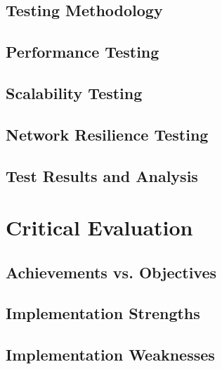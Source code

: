 \documentclass[12pt,a4paper]{report}
\begin{document}
\section{Testing Methodology}

\section{Performance Testing}

\section{Scalability Testing}

\section{Network Resilience Testing}

\section{Test Results and Analysis}

\chapter{Critical Evaluation}
\section{Achievements vs. Objectives}

\section{Implementation Strengths}

\section{Implementation Weaknesses}
\end{document}
